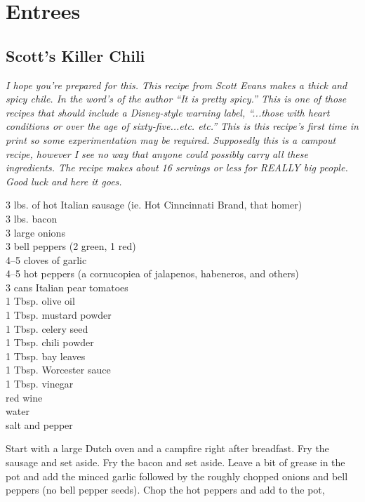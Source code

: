 \chapter{Entrees}

\section{Scott's Killer Chili}

\textit{I hope you're prepared for this.  This recipe from Scott
Evans makes a {\em thick} and {\em spicy} chile.  
In the word's of the author ``It is pretty spicy.''  This
is one of those recipes that should include a Disney-style warning label,
``...those with heart conditions or over the age of sixty-five...etc. etc.'' 
This is this recipe's first time in print so some experimentation may be
required.  Supposedly this is a campout recipe, however I see no way that
anyone could possibly carry all these ingredients.  The recipe makes about 16 
servings or less for REALLY big people.  Good luck and here it goes.}
\begin{ingredients}
3 lbs. of hot Italian sausage (ie. Hot Cinncinnati Brand, that homer) \\
3 lbs. bacon \\
3 large onions \\
3 bell peppers (2 green, 1 red) \\
4--5 cloves of garlic \\
4--5 hot peppers (a cornucopiea of jalapenos, habeneros, and others) \\
3 cans Italian pear tomatoes \\
1 Tbsp. olive oil \\
1 Tbsp. mustard powder \\
1 Tbsp. celery seed \\
1 Tbsp. chili powder \\
1 Tbsp. bay leaves \\
1 Tbsp. Worcester sauce \\
1 Tbsp. vinegar \\
red wine \\
water \\
salt and pepper
\end{ingredients}
Start with a large Dutch oven and a campfire right after breadfast.  Fry the
sausage and set aside.  Fry the bacon and set aside.  Leave a bit of grease in
the pot and add the minced garlic followed by the roughly chopped onions and
bell peppers (no bell pepper seeds).  Chop the hot peppers and add to the pot,
